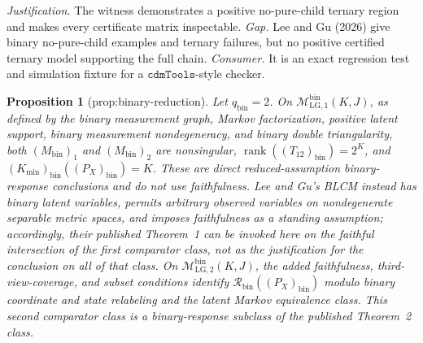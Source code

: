\documentclass{article}
\newtheorem{proposition}{Proposition}
\begin{document}
\par\smallskip\noindent \textit{Justification.} The witness demonstrates a positive no-pure-child ternary region and makes every certificate matrix inspectable. \textit{Gap.} Lee and Gu (2026) give binary no-pure-child examples and ternary failures, but no positive certified ternary model supporting the full chain. \textit{Consumer.} It is an exact regression test and simulation fixture for a \(\texttt{cdmTools}\)-style checker.

\begin{proposition}[prop:binary-reduction]\label{prop:binary-reduction}
Let \(q_{\mathrm{bin}}=2\).  On
\(\mathcal M_{\mathrm{LG},1}^{\mathrm{bin}}(K,J)\), as defined by the binary
measurement graph, Markov factorization, positive latent support, binary
measurement nondegeneracy, and binary double triangularity, both
\((M_{\mathrm{bin}})_1\) and \((M_{\mathrm{bin}})_2\) are nonsingular,
\(\operatorname{rank}((T_{12})_{\mathrm{bin}})=2^K\), and
\((K_{\min})_{\mathrm{bin}}((P_X)_{\mathrm{bin}})=K\).  These are direct
reduced-assumption binary-response conclusions and do not use faithfulness.
Lee and Gu's BLCM instead has binary latent variables, permits arbitrary
observed variables on nondegenerate separable metric spaces, and imposes
faithfulness as a standing assumption; accordingly, their published
Theorem~1 can be invoked here on the faithful intersection of the first
comparator class, not as the justification for the conclusion on all of that
class.  On
\(\mathcal M_{\mathrm{LG},2}^{\mathrm{bin}}(K,J)\), the added faithfulness,
third-view-coverage, and subset conditions identify
\(\mathcal R_{\mathrm{bin}}((P_X)_{\mathrm{bin}})\) modulo binary coordinate
and state relabeling and the latent Markov equivalence class.  This second
comparator class is a binary-response subclass of the published Theorem~2
class.
\end{proposition}
\end{document}
